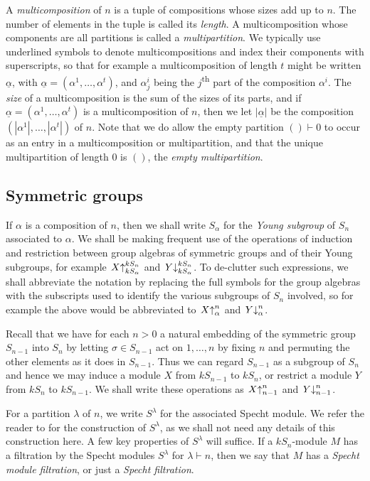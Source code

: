 \documentclass[ALCO,Unicode,published]{cedram}
\newcommand{\tss}[1]{\textsuperscript{#1}}
\newcommand{\ul}[1]{\underline{#1}}
\begin{document}
A \textit{multicomposition} of $n$ is a tuple of compositions whose sizes add up to $n$. The number of elements in the tuple is called
its \textit{length}. A multicomposition whose components are all partitions is called a \textit{multipartition}. We typically use
underlined symbols to denote multicompositions and index their components with superscripts, so that for example a multicomposition of
length $t$ might be written $\ul{\alpha}$, with $\ul{\alpha} = (\alpha^1,\ldots,\alpha^t)$, and $\alpha^i_j$ being the $j$\tss{th} part
of the composition $\alpha^i$. The \textit{size} of a multicomposition is the sum of the sizes of its parts, and if
$\ul{\alpha} = (\alpha^1,\ldots,\alpha^t)$ is a multicomposition of $n$, then we let $|\ul{\alpha}|$ be the composition
$(|\alpha^1|,\ldots,|\alpha^t|)$ of $n$. Note that we do allow the empty partition $() \vdash 0$ to occur as an entry in a
multicomposition or multipartition, and that the unique multipartition of length 0 is $()$, the \textit{empty multipartition}.

\subsection{Symmetric groups}
If $\alpha$ is a composition of $n$, then we shall write $S_\alpha$ for the \textit{Young subgroup} of $S_n$ associated to $\alpha$.
We shall be making frequent use of the operations of induction and restriction between group algebras of symmetric groups and of their
Young subgroups, for example
$\left.X\right\uparrow^{kS_n}_{kS_\alpha}$ and $\left.Y\right\downarrow^{kS_n}_{kS_\alpha}$.
To de-clutter such expressions, we shall abbreviate the notation by replacing the full symbols for the group algebras with the subscripts
used to identify the various subgroups of $S_n$ involved, so for example the above would be abbreviated to
$\left.X\right\uparrow^{n}_{\alpha}$ and $\left.Y\right\downarrow^{n}_{\alpha}$.

Recall that we have for each $n > 0$ a natural embedding of the symmetric group $S_{n-1}$ into $S_n$ by letting
$\sigma \in S_{n-1}$ act on ${1,\ldots,n}$ by fixing $n$ and permuting the other elements as it does in $S_{n-1}$. Thus we can regard
$S_{n-1}$ as a subgroup of $S_n$ and hence we may induce a module $X$ from $kS_{n-1}$ to $kS_n$, or restrict a module $Y$ from $kS_n$ to
$kS_{n-1}$. We shall write these operations as
$\left.X\right\uparrow^{n}_{n-1}$  and $\left.Y\right\downarrow^{n}_{n-1}$.

For a partition $\lambda$ of $n$, we write $S^\lambda$ for the associated Specht module. We refer the reader to \cite[Ch. 4]{JAMSN} for
the construction of $S^\lambda$, as we shall not need any details of this construction here. A few key properties of $S^\lambda$ will
suffice. If a $kS_n$-module $M$ has a filtration by the Specht modules $S^\lambda$ for $\lambda \vdash n$, then we say that $M$ has a
\textit{Specht module filtration}, or just a \textit{Specht filtration}.
\end{document}
